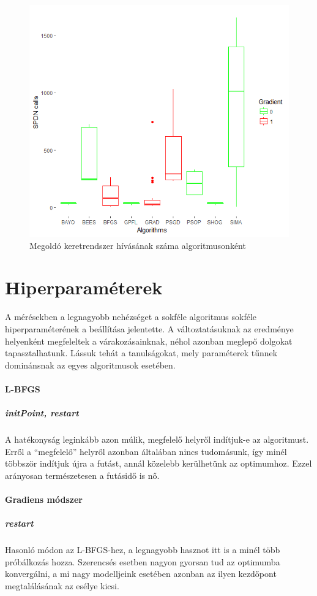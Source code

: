\begin{figure}
	\centering
	\includegraphics[width=140mm, keepaspectratio]{figures/func_calcs_boxplot.png}
	\caption{Megoldó keretrendszer hívásának száma algoritmusonként}
	\label{fig:funccalc}
\end{figure}

\section{Hiperparaméterek}
A mérésekben a legnagyobb nehézséget a sokféle algoritmus sokféle hiperparaméterének a beállítása jelentette. A változtatásuknak az eredménye helyenként megfeleltek a várakozásainknak, néhol azonban meglepő dolgokat tapasztalhatunk. Lássuk tehát a tanulságokat, mely paraméterek tűnnek dominánsnak az egyes algoritmusok esetében.
\paragraph{L-BFGS} \subparagraph{initPoint, restart} A hatékonyság leginkább azon múlik, megfelelő helyről indítjuk-e az algoritmust. Erről a ``megfelelő'' helyről azonban általában nincs tudomásunk, így minél többször indítjuk újra a futást, annál közelebb kerülhetünk az optimumhoz. Ezzel arányosan természetesen a futásidő is nő.
\paragraph{Gradiens módszer}\subparagraph{restart} Hasonló módon az L-BFGS-hez, a legnagyobb hasznot itt is a minél több próbálkozás hozza. Szerencsés esetben nagyon gyorsan tud az optimumba konvergálni, a mi nagy modelljeink esetében azonban az ilyen kezdőpont megtalálásának az esélye kicsi.
